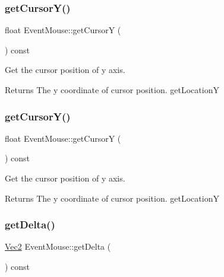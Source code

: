 \subsubsection{\texorpdfstring{get\+Cursor\+Y()}{getCursorY()}\hspace{0.1cm}{\footnotesize\ttfamily [1/2]}}
{\footnotesize\ttfamily float Event\+Mouse\+::get\+CursorY (\begin{DoxyParamCaption}{ }\end{DoxyParamCaption}) const\hspace{0.3cm}{\ttfamily [inline]}}

Get the cursor position of y axis.

\begin{DoxyReturn}{Returns}
The y coordinate of cursor position.  get\+LocationY 
\end{DoxyReturn}
\mbox{\label{classEventMouse_af63042e92d51480cdc990360eb4e1166}} 
\subsubsection{\texorpdfstring{get\+Cursor\+Y()}{getCursorY()}\hspace{0.1cm}{\footnotesize\ttfamily [2/2]}}
{\footnotesize\ttfamily float Event\+Mouse\+::get\+CursorY (\begin{DoxyParamCaption}{ }\end{DoxyParamCaption}) const\hspace{0.3cm}{\ttfamily [inline]}}

Get the cursor position of y axis.

\begin{DoxyReturn}{Returns}
The y coordinate of cursor position.  get\+LocationY 
\end{DoxyReturn}
\mbox{\label{classEventMouse_abda7f9a6569febd5041d4efd7fca35e6}} 
\subsubsection{\texorpdfstring{get\+Delta()}{getDelta()}\hspace{0.1cm}{\footnotesize\ttfamily [1/2]}}
{\footnotesize\ttfamily \hyperlink{classVec2}{Vec2} Event\+Mouse\+::get\+Delta (\begin{DoxyParamCaption}{ }\end{DoxyParamCaption}) const}

